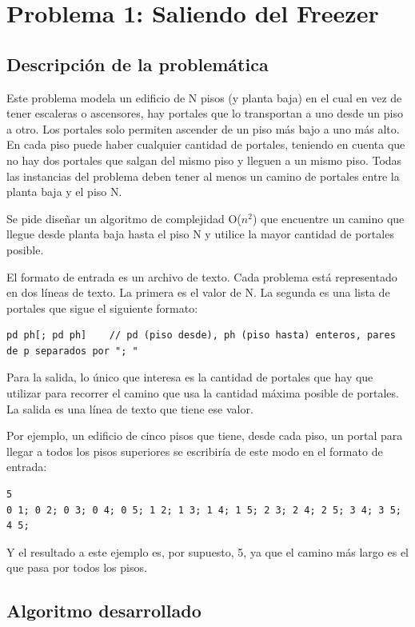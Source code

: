 \section{Problema 1: Saliendo del Freezer}

\subsection{Descripción de la problemática}
Este problema modela un edificio de N pisos (y planta baja) en el cual en vez de tener escaleras o ascensores, hay portales que lo transportan a uno desde un piso a otro. Los portales solo permiten ascender de un piso más bajo a uno más alto. En cada piso puede haber cualquier cantidad de portales, teniendo en cuenta que no hay dos portales que salgan del mismo piso y lleguen a un mismo piso. Todas las instancias del problema deben tener al menos un camino de portales entre la planta baja y el piso N.

Se pide diseñar un algoritmo de complejidad O($n^{2}$) que encuentre un camino que llegue desde planta baja hasta el piso N y utilice la mayor cantidad de portales posible.

El formato de entrada es un archivo de texto. Cada problema está representado en dos líneas de texto. La primera es el valor de N. La segunda es una lista de portales que sigue el siguiente formato:

\begin{verbatim}
pd ph[; pd ph]    // pd (piso desde), ph (piso hasta) enteros, pares de p separados por "; "
\end{verbatim}

Para la salida, lo único que interesa es la cantidad de portales que hay que utilizar para recorrer el camino que usa la cantidad máxima posible de portales. La salida es una línea de texto que tiene ese valor.


Por ejemplo, un edificio de cinco pisos que tiene, desde cada piso, un portal para llegar a todos los pisos superiores se escribiría de este modo en el formato de entrada:

\begin{verbatim}
5
0 1; 0 2; 0 3; 0 4; 0 5; 1 2; 1 3; 1 4; 1 5; 2 3; 2 4; 2 5; 3 4; 3 5; 4 5;
\end{verbatim}

Y el resultado a este ejemplo es, por supuesto, 5, ya que el camino más largo es el que pasa por todos los pisos.


\subsection{Algoritmo desarrollado}


